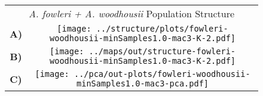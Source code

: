 \documentclass[border=10pt,varwidth=30cm]{standalone}
\begin{document}
\begin{figure}
\begin{tabular}[t]{cc}
    \multicolumn{2}{c}{\Large \textit{A. fowleri + A. woodhousii} Population Structure} \\
  {\textbf{\large A)}} & \texttt{[image: ../structure/plots/fowleri-woodhousii-minSamples1.0-mac3-K-2.pdf]} \\ \vspace{1mm}
  {\textbf{\large B)}} & \texttt{[image: ../maps/out/structure-fowleri-woodhousii-minSamples1.0-mac3-K-2.pdf]} \\
  {\textbf{\large C)}} & \texttt{[image: ../pca/out-plots/fowleri-woodhousii-minSamples1.0-mac3-pca.pdf]} \\
\end{tabular}
\end{figure}
\end{document}

